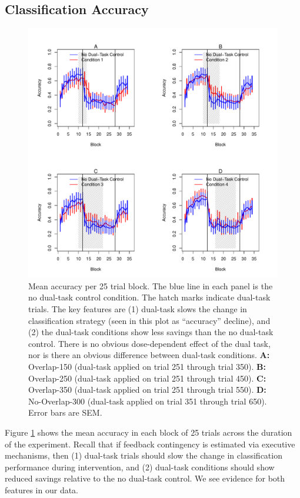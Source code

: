 \documentclass[apacite,draftfirst,jou]{apa6}
\begin{document}
\subsection*{Classification Accuracy}
\begin{figure}[t]
\centering \includegraphics[width=1.0\textwidth]{../figures/fig_learning_curves.pdf}
\caption{ Mean accuracy per 25 trial block. The blue line in each panel is
  the no dual-task control condition. The hatch marks indicate dual-task trials.
  The key features are (1) dual-task slows the change in classification strategy
  (seen in this plot as ``accuracy'' decline), and (2) the dual-task conditions
  show less savings than the no dual-task control. There is no obvious
  dose-dependent effect of the dual task, nor is there an obvious difference
  between dual-task conditions.
  \textbf{A:} Overlap-150 (dual-task applied on trial 251 through trial 350).
  \textbf{B:} Overlap-250 (dual-task applied on trial 251 through trial 450).
  \textbf{C:} Overlap-350 (dual-task applied on trial 251 through trial 550).
  \textbf{D:} No-Overlap-300 (dual-task applied on trial 351 through trial 650).
  Error bars are SEM. }
  \label{fig:learning_curves}
\end{figure}

Figure \ref{fig:learning_curves} shows the mean accuracy in each block of 25
trials across the duration of the experiment. Recall that if feedback
contingency is estimated via executive mechanisms, then (1) dual-task trials
should slow the change in classification performance during intervention, and
(2) dual-task conditions should show reduced savings relative to the no
dual-task control. We see evidence for both features in our data.
\end{document}
